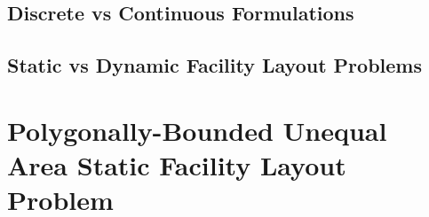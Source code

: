 \subsection{Discrete vs Continuous Formulations}

\subsection{Static vs Dynamic Facility Layout Problems}


\section{Polygonally-Bounded Unequal Area Static Facility Layout Problem}
